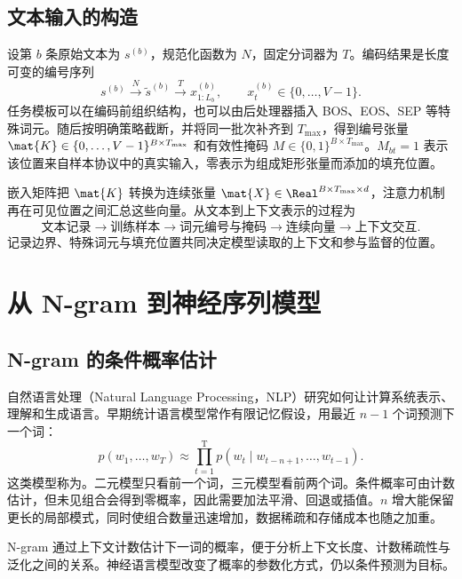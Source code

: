 \documentclass[../textbook.tex]{subfiles}
\begin{document}
\subsection{文本输入的构造}
设第 $b$ 条原始文本为 $s^{(b)}$，规范化函数为 $N$，固定分词器为 $T$。编码结果是长度可变的编号序列
\begin{equation}
 s^{(b)}\xrightarrow{N}\widetilde s^{(b)}
 \xrightarrow{T}x^{(b)}_{1:L_b},
 \qquad x^{(b)}_t\in\{0,\ldots,V-1\}.
\end{equation}
任务模板可以在编码前组织结构，也可以由后处理器插入 BOS、EOS、SEP 等特殊词元。随后按明确策略截断，并将同一批次补齐到 $T_{\max}$，得到编号张量 $\mat{K}\in\{0,\ldots,V-1\}^{B\times T_{\max}}$ 和有效性掩码 $M\in\{0,1\}^{B\times T_{\max}}$。$M_{bt}=1$ 表示该位置来自样本协议中的真实输入，零表示为组成矩形张量而添加的填充位置。

嵌入矩阵把 $\mat{K}$ 转换为连续张量 $\mat{X}\in\Real^{B\times T_{\max}\times d}$，注意力机制再在可见位置之间汇总这些向量。从文本到上下文表示的过程为
\begin{equation}
 \text{文本记录}\longrightarrow\text{训练样本}
 \longrightarrow\text{词元编号与掩码}
 \longrightarrow\text{连续向量}\longrightarrow\text{上下文交互}.
\end{equation}
记录边界、特殊词元与填充位置共同决定模型读取的上下文和参与监督的位置。

\section{从 N-gram 到神经序列模型}

\subsection{N-gram 的条件概率估计}
自然语言处理（Natural Language Processing，NLP）研究如何让计算系统表示、理解和生成语言。早期统计语言模型常作有限记忆假设，用最近 $n-1$ 个词预测下一个词：
\begin{equation}
 p(w_1,\ldots,w_T)\approx
 \prod_{t=1}^{\mathrm{T}}p(w_t\mid w_{t-n+1},\ldots,w_{t-1}).
\end{equation}
这类模型称为。二元模型只看前一个词，三元模型看前两个词。条件概率可由计数估计，但未见组合会得到零概率，因此需要加法平滑、回退或插值。$n$ 增大能保留更长的局部模式，同时使组合数量迅速增加，数据稀疏和存储成本也随之加重。

N-gram 通过上下文计数估计下一词的概率，便于分析上下文长度、计数稀疏性与泛化之间的关系。神经语言模型改变了概率的参数化方式，仍以条件预测为目标。
\end{document}
